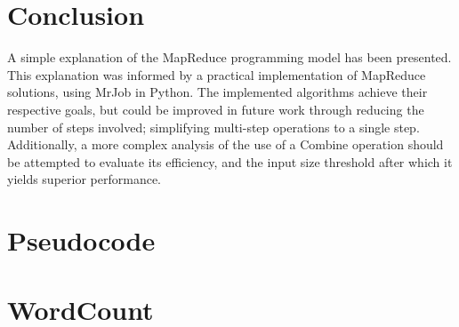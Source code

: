 \documentclass[journal,10pt]{IEEEtran}
\begin{document}
\section{Conclusion}
A simple explanation of the MapReduce programming model has been presented. This explanation was informed by a practical implementation of MapReduce solutions, using MrJob in Python. The implemented algorithms achieve their respective goals, but could be improved in future work through reducing the number of steps involved; simplifying multi-step operations to a single step. Additionally, a more complex analysis of the use of a Combine operation should be attempted to evaluate its efficiency, and the input size threshold after which it yields superior performance.

\printbibliography

\clearpage

\onecolumn



\section*{Pseudocode}
\section*{WordCount}
\end{document}
